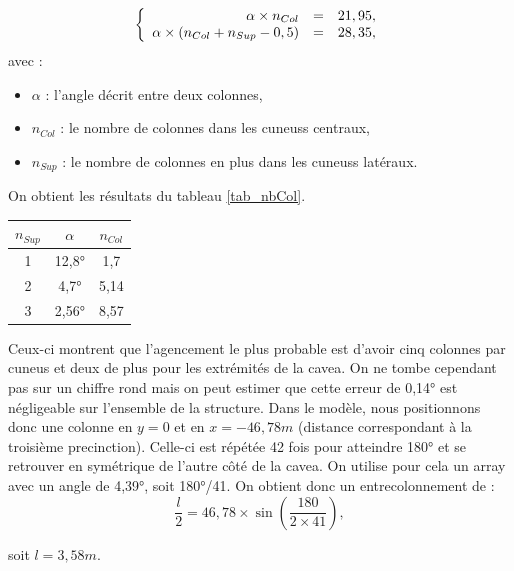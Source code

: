 \begin{equation}
  \left \{
   \begin{array}{r c l}
      \alpha \times n_{Col}  & = & 21,95, \\
      \alpha \times (n_{Col} + n_{Sup} - 0,5)   & = &  28,35,
   \end{array}
   \right .
\end{equation}
avec :
\begin{itemize}
\item $\alpha$ : l'angle décrit entre deux colonnes,
\item $n_{Col}$ : le nombre de colonnes dans les \glspl{cuneus} centraux,
\item $n_{Sup}$ : le nombre de colonnes en plus dans les \glspl{cuneus} latéraux.
\end{itemize}
On obtient les résultats du tableau \ref{tab_nbCol}.
%
\begin{tableth} 
	\begin{tabular}{| c | c | c |}
		\hline
		$n_{Sup}$ & $\alpha$ &  $n_{Col}$\\
		  \hline
		  \hline
		   1 & 12,8° & 1,7 \\
		   \hline
		2 & 4,7° & 5,14 \\
		   \hline
		3 & 2,56° & 8,57 \\
		   \hline
	 \end{tabular}
	\caption{Angle entre deux colonne et nombre de colonnes par \gls{cuneus} en fonction du nombre de colonnes supplémentaires dans les \glspl{cuneus} latéraux.}
	\label{tab_nbCol}
\end{tableth}
%
Ceux-ci montrent que l'agencement le plus probable est d'avoir cinq colonnes par \gls{cuneus} et deux de plus pour les extrémités de la \gls{cavea}. On ne tombe cependant pas sur un chiffre rond mais on peut estimer que cette erreur de 0,14° est négligeable sur l'ensemble de la structure. Dans le modèle, nous positionnons donc une colonne en $y=0$ et en $x=-46,78m$ (distance correspondant à la troisième \gls{precinction}). Celle-ci est répétée 42 fois pour atteindre 180° et se retrouver en symétrique de l'autre côté de la \gls{cavea}. On utilise pour cela un \gls{array} avec un angle de 4,39°, soit 180°/41. On obtient donc un entrecolonnement de :
\begin{equation}
	\frac{l}{2} =  46,78 \times  \sin(\frac{180}{2 \times 41}), 
\end{equation}
\begin{center}
	soit $l = 3,58m$.
\end{center}	

